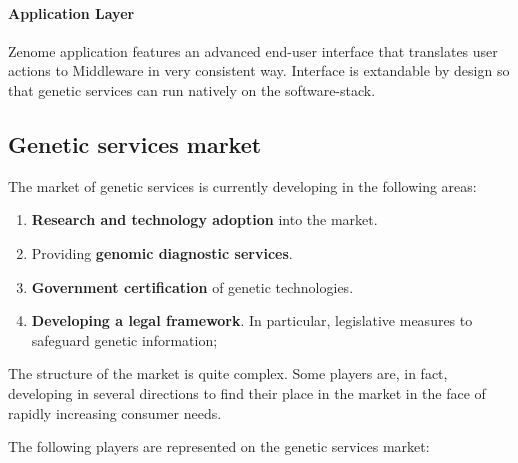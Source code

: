 \paragraph*{Application Layer} Zenome application features an advanced end-user interface that translates user actions to Middleware in very consistent way. Interface is extandable by design so that genetic services can run natively on the software-stack.


\subsection{Genetic services market} %
The market of genetic services is currently developing in the following areas:
\begin{enumerate}
  \item \textbf{Research and technology adoption} into the market.
  \item Providing \textbf{genomic diagnostic services}.
  \item \textbf{Government certification} of genetic technologies.
  \item \textbf{Developing a legal framework}. In particular, legislative measures to safeguard genetic information;
\end{enumerate}

\begin{note}
  The structure of the market is quite complex. Some players are, in fact, developing in several directions to find their place in the market in the face of rapidly increasing consumer needs.
\end{note}


The following players are represented on the genetic services market:

